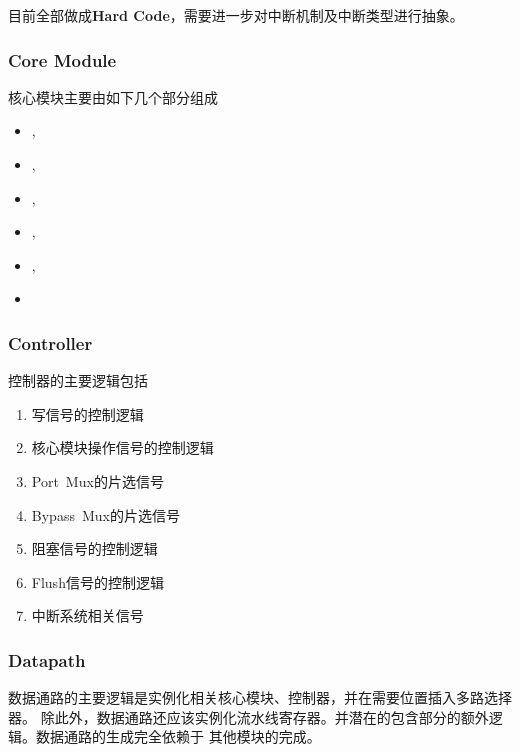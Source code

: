 \documentclass[hyperref,UTF8]{ctexart}
\theoremstyle{definition}
\theoremstyle{remark}
\numberwithin{equation}{subsection}
\newcommand{\Emph}{\textbf}
\begin{document}
	目前全部做成\Emph{Hard Code}，需要进一步对中断机制及中断类型进行抽象。
	
	
\subsubsection{Core Module}
	
	核心模块主要由如下几个部分组成
	\begin{itemize}	
		\item {}, 
		\item {}, 
		\item {}, 
		\item {}, 
		\item {}, 
		\item {}
	\end{itemize}
	
\subsubsection{Controller}

	控制器的主要逻辑包括
	\begin{enumerate}[(1)]
		
		\item 写信号的控制逻辑
		
		\item 核心模块操作信号的控制逻辑
		
		\item Port\ Mux的片选信号
		
		\item Bypass\ Mux的片选信号
		
		\item 阻塞信号的控制逻辑
		
		\item Flush信号的控制逻辑
		
		\item 中断系统相关信号
		
	\end{enumerate}

\subsubsection{Datapath}

	数据通路的主要逻辑是实例化相关核心模块、控制器，并在需要位置插入多路选择器。
	除此外，数据通路还应该实例化流水线寄存器。并潜在的包含部分的额外逻辑。数据通路的生成完全依赖于
	其他模块的完成。
\end{document}
